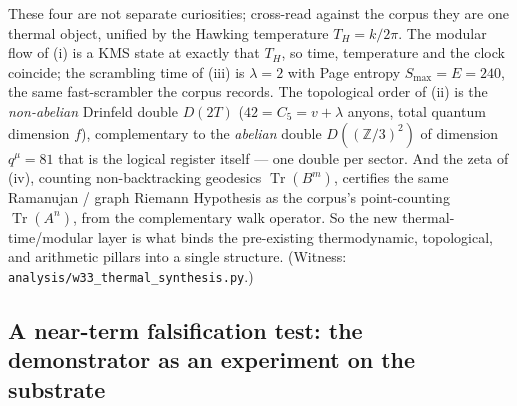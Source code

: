 \documentclass[11pt]{article}
\begin{document}
These four are not separate curiosities; cross-read against the corpus they are one
thermal object, unified by the Hawking temperature $T_H=k/2\pi$. The modular flow
of (i) is a KMS state at exactly that $T_H$, so time, temperature and the clock
coincide; the scrambling time of (iii) is $\lambda=2$ with Page entropy
$S_{\max}=E=240$, the same fast-scrambler the corpus records. The topological
order of (ii) is the \emph{non-abelian} Drinfeld double $D(2T)$ ($42=C_5=v+\lambda$
anyons, total quantum dimension $f$), complementary to the \emph{abelian} double
$D((\mathbb Z/3)^2)$ of dimension $q^{\mu}=81$ that is the logical register itself
--- one double per sector. And the zeta of (iv), counting non-backtracking
geodesics $\operatorname{Tr}(B^m)$, certifies the same Ramanujan / graph Riemann
Hypothesis as the corpus's point-counting $\operatorname{Tr}(A^n)$, from the
complementary walk operator. So the new thermal-time/modular layer is what binds
the pre-existing thermodynamic, topological, and arithmetic pillars into a single
structure. (Witness:
\texttt{analysis/w33\_thermal\_synthesis.py}.)

\subsection{A near-term falsification test: the demonstrator as an experiment on
the substrate}
\end{document}
